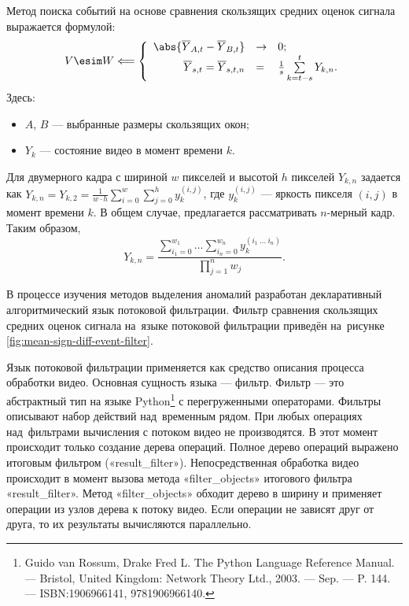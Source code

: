 \documentclass{.local/lib/classes/ndvr-super-article-standalone}
\begin{document}
    Метод поиска событий на основе 
    сравнения скользящих средних оценок сигнала
    выражается формулой:
    \[
        V \esim  W \Longleftarrow  \left\lbrace
            \begin{array}{rll}
                \abs{\overline{Y}_{A,t} - \overline{Y}_{B,t}} & \to & 0; \\
                \overline{Y}_{s,t} = \overline{Y}_{s,t,n}  & = & \frac{1}{s}\sum\limits^{t}_{k=t-s} Y_{k,n}.
            \end{array}
        \right.   
    \]
    Здесь:
    \begin{itemize}
        \item {
            $A$, $B$ — выбранные размеры скользящих окон;
        }
        \item {
            $Y_{k}$ — состояние видео в момент времени $k$.
        }
    \end{itemize}
    Для двумерного кадра с шириной $w$ пикселей и высотой $h$ 
    пикселей $Y_{k,n}$ задается как $
        Y_{k,n} = Y_{k,2}  =  \frac{1}{w \cdot h } 
            \sum\limits_{i=0}^{w} \sum\limits_{j=0}^{h}
                y_{k}^{(i, j)}
    $, где $y_{k}^{(i, j)}$ — яркость 
    пикселя $(i, j)$ в момент времени $k$.
    В общем случае, предлагается рассматривать $n$-мерный кадр.
    Таким образом, \[
            Y_{k,n} = 
            \dfrac
                { \sum\limits_{i_1=0}^{w_1} 
                    \ldots 
                        \sum\limits_{i_n=0}^{w_n} 
                            y_{k}^{(i_1\ \ldots\ i_n)}}
                {\prod\limits_{j=1}^{n} w_j  } .
    \]

    В процессе изучения методов выделения аномалий
    разработан декларативный алгоритмический 
    язык потоковой фильтрации.
    Фильтр сравнения скользящих средних оценок сигнала
    на~языке потоковой фильтрации приведён на~рисунке 
    \ref{fig:mean-sign-diff-event-filter}.

    Язык потоковой фильтрации применяется 
    как средство описания процесса обработки видео.
    Основная сущность языка — фильтр. 
    Фильтр — это абстрактный тип на языке Python\footnote{
        Guido van Rossum, Drake Fred L. 
        The Python Language Reference Manual. ––
        Bristol, United Kingdom: Network Theory Ltd., 
        2003. –– Sep. –– P. 144. 
        –– ISBN:1906966141, 9781906966140.
    } 
    с перегруженными операторами. 
    Фильтры описывают набор действий над~временным рядом.
    При любых операциях над~фильтрами вычисления 
    с потоком видео не производятся. 
    В этот момент происходит только создание дерева операций.
    Полное дерево операций выражено итоговым фильтром 
    («result\_filter»). 
    Непосредственная обработка видео происходит 
    в момент вызова метода 
    «filter\_objects» итогового фильтра «result\_filter».
    Метод «filter\_objects» обходит дерево в ширину
    и применяет операции из узлов дерева к потоку видео.
    Если операции не зависят друг от друга,
    то их результаты вычисляются параллельно. 
\end{document}
